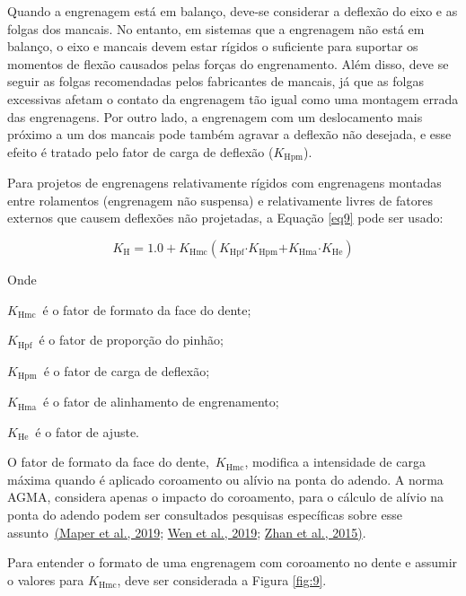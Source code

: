 \documentclass[12pt,a4paper]{article}
\begin{document}
Quando a engrenagem está em balanço, deve-se considerar a deflexão do
eixo e as folgas dos mancais. No entanto, em sistemas que a engrenagem
não está em balanço, o eixo e mancais devem estar rígidos o suficiente
para suportar os momentos de flexão causados pelas forças do
engrenamento. Além disso, deve se seguir as folgas recomendadas pelos
fabricantes de mancais, já que as folgas excessivas afetam o contato da
engrenagem tão igual como uma montagem errada das engrenagens. Por outro
lado, a engrenagem com um deslocamento mais próximo a um dos mancais
pode também agravar a deflexão não desejada, e esse efeito é tratado
pelo fator de carga de deflexão (\(K_{\text{Hpm}}\)).

Para projetos de engrenagens relativamente rígidos com engrenagens
montadas entre rolamentos (engrenagem não suspensa) e relativamente
livres de fatores externos que causem deflexões não projetadas, a
Equação {\ref{eq9}} pode ser usado:

\par\null

\begin{equation}
    \label{eq9}
K_{\mathrm{H}}\mathrm{=1.0+}K_{\mathrm{Hmc}}\left(K_{\mathrm{Hpf}}{\mathrm{\cdot }K}_{\mathrm{Hpm}}\mathrm{+}K_{\mathrm{Hma}}\mathrm{\cdot }K_{\mathrm{He}}\right)
\end{equation}

Onde

\(K_{\text{Hmc}}\)~é o fator de formato da face do dente;

\(K_{\text{Hpf}}\)~é o fator de proporção do pinhão;

\(K_{\text{Hpm}}\)~é o fator de carga de deflexão;

\(K_{\text{Hma}}\)~é o fator de alinhamento de engrenamento;

\(K_{\text{He}}\)~é o fator de ajuste.

O fator de formato da face do dente,~\(K_{\text{Hmc}}\), modifica a
intensidade de carga máxima quando é aplicado coroamento ou alívio na
ponta do adendo. A norma AGMA, considera apenas o impacto do coroamento,
para o cálculo de alívio na ponta do adendo podem ser consultados
pesquisas específicas sobre esse assunto~\hyperref[csl:12]{(Maper et al., 2019}; \hyperref[csl:9]{Wen et al., 2019}; \hyperref[csl:11]{Zhan et al., 2015)}.

Para entender o formato de uma engrenagem com coroamento no dente e
assumir o valores para \(K_{\text{Hmc}}\), deve ser considerada a Figura
{\ref{fig:9}}.
\end{document}

